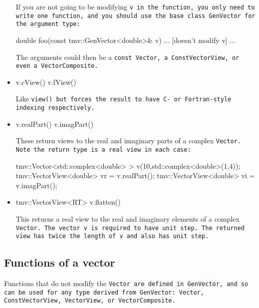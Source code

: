 \begin{itemize}
If you are not going to be modifying \tt{v} in the function, you only need to
write one function, and you should use the base class \tt{GenVector} 
for the argument type:
\begin{tmvcode}
double foo(const tmv::GenVector<double>& v)
{ ... [doesn't modify v] ... }
\end{tmvcode}
The arguments could then be a \tt{const Vector}, a \tt{ConstVectorView},
or even a \tt{VectorComposite}.

\item
\begin{tmvcode}
v.cView()
v.fView()
\end{tmvcode}
Like \tt{view()} but forces the result to have C- or Fortran-style indexing respectively.

\item
\begin{tmvcode}
v.realPart()
v.imagPart()
\end{tmvcode}
These return views to the real and imaginary parts of a complex \tt{Vector}.
Note the return type is a real view in each case:
\begin{tmvcode}
tmv::Vector<std::complex<double> > v(10,std::complex<double>(1,4));
tmv::VectorView<double> vr = v.realPart();
tmv::VectorView<double> vi = v.imagPart();
\end{tmvcode}

\item
\begin{tmvcode}
tmv::VectorView<RT> v.flatten()
\end{tmvcode}
This returns a real view to the real and imaginary elements of a complex \tt{Vector}. 
The vector \tt{v} is required to have unit step.  The returned view has twice the 
length of \tt{v} and also has unit step.

\end{itemize}

\subsection{Functions of a vector }
\label{Vector_Functions}

Functions that do not modify the \tt{Vector} are defined in 
\tt{GenVector}, and so can be used for any type derived from \tt{GenVector}:
\tt{Vector, ConstVectorView, VectorView,} or \tt{VectorComposite}.

